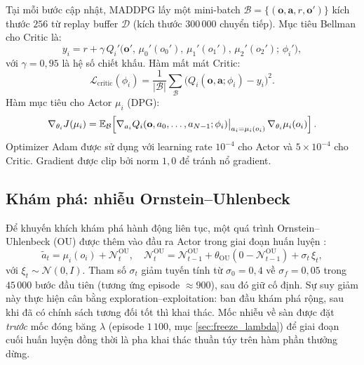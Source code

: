 Tại mỗi bước cập nhật, MADDPG lấy một mini-batch
$\mathcal{B} = \{(\mathbf{o}, \mathbf{a}, r, \mathbf{o}')\}$ kích thước $256$
từ replay buffer $\mathcal{D}$ (kích thước $300\,000$ chuyển tiếp). Mục
tiêu Bellman cho Critic là:
\begin{equation}
y_i = r + \gamma\,Q_i'\!\big(\mathbf{o}',\, \mu_0'(o_0'),\, \mu_1'(o_1'),\,
                              \mu_2'(o_2');\,\phi_i'\big),
\label{eq:bellman_target}
\end{equation}
với $\gamma = 0{,}95$ là hệ số chiết khấu. Hàm mất mát Critic:
\begin{equation}
\mathcal{L}_{\text{critic}}(\phi_i) =
\frac{1}{|\mathcal{B}|}\sum_{\mathcal{B}}
\big(Q_i(\mathbf{o}, \mathbf{a}; \phi_i) - y_i\big)^2.
\label{eq:critic_loss}
\end{equation}
Hàm mục tiêu cho Actor $\mu_i$ (DPG):
\begin{equation}
\nabla_{\theta_i} J(\mu_i) =
\mathbb{E}_{\mathcal{B}}\!\left[\nabla_{a_i} Q_i(\mathbf{o}, a_0, \ldots, a_{N-1}; \phi_i)
                         \big|_{a_i = \mu_i(o_i)}\,
                         \nabla_{\theta_i} \mu_i(o_i)\right].
\label{eq:actor_gradient}
\end{equation}
Optimizer Adam được sử dụng với learning rate $10^{-4}$ cho Actor và
$5 \times 10^{-4}$ cho Critic. Gradient được clip bởi norm $1{,}0$
để tránh nổ gradient.

\subsection{Khám phá: nhiễu Ornstein--Uhlenbeck}

Để khuyến khích khám phá hành động liên tục, một quá trình
Ornstein--Uhlenbeck (OU) được thêm vào đầu ra Actor trong giai đoạn
huấn luyện \cite{lillicrap2016continuous}:
\begin{equation}
\tilde a_t = \mu_i(o_i) + \mathcal{N}_t^{\text{OU}}, \quad
\mathcal{N}_t^{\text{OU}} = \mathcal{N}_{t-1}^{\text{OU}} + \theta_{\text{OU}}(0 - \mathcal{N}_{t-1}^{\text{OU}}) + \sigma_t\,\xi_t,
\end{equation}
với $\xi_t \sim \mathcal{N}(0, I)$. Tham số $\sigma_t$ giảm tuyến tính từ
$\sigma_0 = 0{,}4$ về $\sigma_f = 0{,}05$ trong $45\,000$ bước đầu tiên
(tương ứng episode $\approx 900$), sau đó giữ cố định. Sự suy giảm này
thực hiện cân bằng exploration--exploitation: ban đầu khám phá rộng,
sau khi đã có chính sách tương đối tốt thì khai thác. Mốc nhiễu về sàn
được đặt \emph{trước} mốc đóng băng $\lambda$ (episode $1\,100$, mục
\ref{sec:freeze_lambda}) để giai đoạn cuối huấn luyện đồng thời là pha
khai thác thuần túy trên hàm phần thưởng dừng.

